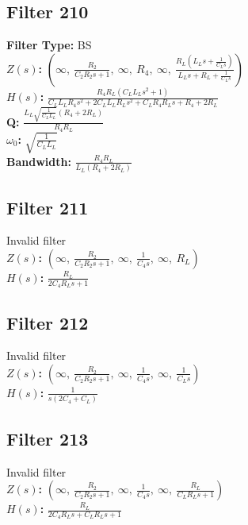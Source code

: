 \documentclass{article}
\begin{document}
\subsection*{Filter 210}
\textbf{Filter Type:} BS \\ 
\textbf{$Z(s)$:} $\left( \infty, \  \frac{R_{2}}{C_{2} R_{2} s + 1}, \  \infty, \  R_{4}, \  \infty, \  \frac{R_{L} \left(L_{L} s + \frac{1}{C_{L} s}\right)}{L_{L} s + R_{L} + \frac{1}{C_{L} s}}\right)$ \\ 
\textbf{$H(s)$:} $\frac{R_{4} R_{L} \left(C_{L} L_{L} s^{2} + 1\right)}{C_{L} L_{L} R_{4} s^{2} + 2 C_{L} L_{L} R_{L} s^{2} + C_{L} R_{4} R_{L} s + R_{4} + 2 R_{L}}$ \\ 
\textbf{Q:} $\frac{L_{L} \sqrt{\frac{1}{C_{L} L_{L}}} \left(R_{4} + 2 R_{L}\right)}{R_{4} R_{L}}$ \\ 
\textbf{$\omega_0$:} $\sqrt{\frac{1}{C_{L} L_{L}}}$ \\ 
\textbf{Bandwidth:} $\frac{R_{4} R_{L}}{L_{L} \left(R_{4} + 2 R_{L}\right)}$ \\ 
\subsection*{Filter 211}
Invalid filter \\ 
\textbf{$Z(s)$:} $\left( \infty, \  \frac{R_{2}}{C_{2} R_{2} s + 1}, \  \infty, \  \frac{1}{C_{4} s}, \  \infty, \  R_{L}\right)$ \\ 
\textbf{$H(s)$:} $\frac{R_{L}}{2 C_{4} R_{L} s + 1}$ \\ 
\subsection*{Filter 212}
Invalid filter \\ 
\textbf{$Z(s)$:} $\left( \infty, \  \frac{R_{2}}{C_{2} R_{2} s + 1}, \  \infty, \  \frac{1}{C_{4} s}, \  \infty, \  \frac{1}{C_{L} s}\right)$ \\ 
\textbf{$H(s)$:} $\frac{1}{s \left(2 C_{4} + C_{L}\right)}$ \\ 
\subsection*{Filter 213}
Invalid filter \\ 
\textbf{$Z(s)$:} $\left( \infty, \  \frac{R_{2}}{C_{2} R_{2} s + 1}, \  \infty, \  \frac{1}{C_{4} s}, \  \infty, \  \frac{R_{L}}{C_{L} R_{L} s + 1}\right)$ \\ 
\textbf{$H(s)$:} $\frac{R_{L}}{2 C_{4} R_{L} s + C_{L} R_{L} s + 1}$ \\ 
\end{document}
